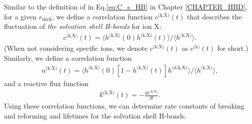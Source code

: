Similar to the definition of \CSHB in Eq.\thinspace\ref{eq:C_s_HB} in Chapter \ref{CHAPTER_HBD},  
for a given $r_\text{shell}$, we define a correlation function $c^\text{(k,X)}(t)$ that describes the fluctuation of \emph{the solvation shell H-bonds} for ion X: 
\begin{eqnarray}
c^\text{(k,X)}(t)=\langle h^\text{(k,X)}(0)h^\text{(k,X)}(t) \rangle/\langle h^\text{(k,X)}\rangle
\label{eq:C_k_HB}.
\end{eqnarray}
(When not considering specific ions, we denote $c^\text{(k,X)}(t)$ as $c^{\text{(k)}}(t)$ for short.)
%
Similarly, we define a correlation function 
\begin{eqnarray}
n^\text{(k,X)}(t)=\langle h^\text{(k,X)}(0)[1-h^\text{(k,X)}(t)]h^\text{(d,k,X)} \rangle/\langle h^\text{(k,X)}\rangle
\label{eq:n_k_HB},
\end{eqnarray}
and a reactive flux function
\begin{eqnarray}
k^\text{(k,X)}(t)= -\frac{dc^\text{(k,X)}}{dt}
\label{eq:k_k_HB}.
\end{eqnarray}
Using these correlation functions, we can determine rate constants of breaking and reforming and lifetimes for the solvation shell H-bonds.
%
